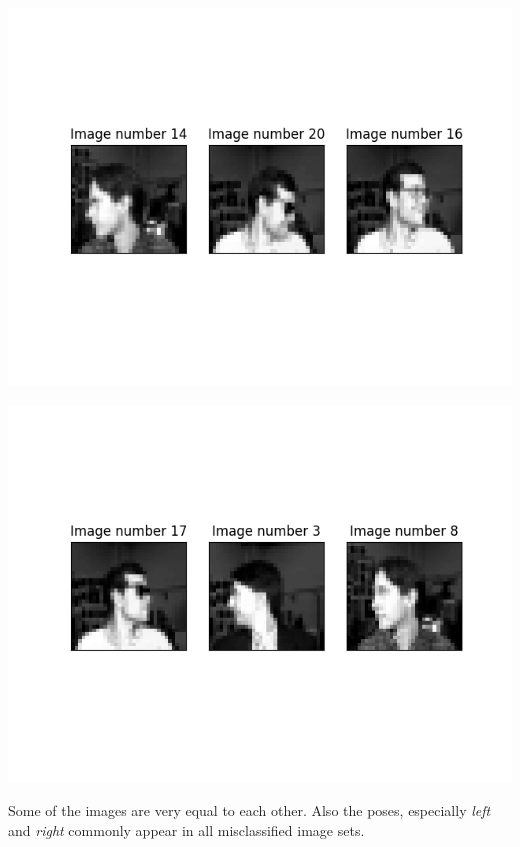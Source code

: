 \documentclass[a4paper]{article}
\begin{document}
\begin{itemize}
\begin{minipage}{0.4\textwidth}
  \includegraphics[scale=0.35]{plots/missclassified3.png}
  \label{plot_simple_nh2}
\end{minipage}
\hfill
\begin{minipage}{0.4\textwidth}
  \includegraphics[scale=0.35]{plots/missclassified4.png}
  \label{plot_simple_nh8}
\end{minipage}
\newline \newline \newline
Some of the images are very equal to each other. Also the poses, especially \textit{left} and \textit{right} commonly appear in all misclassified image sets. 

\end{itemize}

\end{document}

